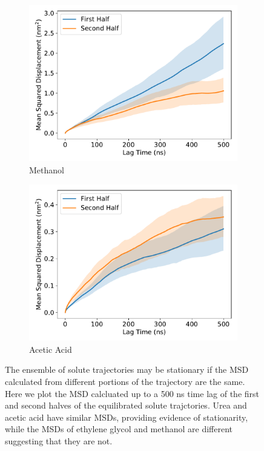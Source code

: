 \documentclass{article}
\begin{document}
\begin{figure}[h]
\begin{subfigure}{0.45\textwidth}
  \includegraphics[width=\textwidth]{MET_MSD_halves.pdf}
  \caption{Methanol}\label{fig:MET_MSD_halves}
  \end{subfigure}
  \begin{subfigure}{0.45\textwidth}
  \includegraphics[width=\textwidth]{ACH_MSD_halves.pdf}
  \caption{Acetic Acid}\label{fig:ACH_MSD_halves}
  \end{subfigure}
  \caption{The ensemble of solute trajectories may be stationary if the MSD
  calculated from different portions of the trajectory are the same. Here we
  plot the MSD calcluated up to a 500 ns time lag of the first and second
  halves of the equilibrated solute trajctories. Urea and acetic acid have
  similar MSDs, providing evidence of stationarity, while the MSDs of 
  ethylene glycol and methanol are different suggesting that they are not.}\label{fig:msd_comparison}
  \end{figure}
\end{document}
